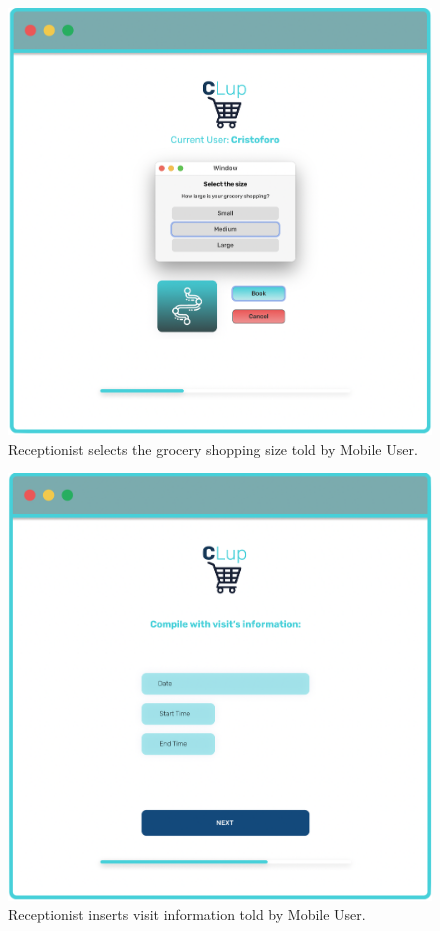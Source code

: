 \begin{figure}[H]
  \caption{Receptionist selects the grocery shopping size told by Mobile User.}
  \label{fig:Login}
  \centering
  \includegraphics[scale=0.31]{images/mockup/Size_Rec.png}

\end{figure}


\begin{figure}[H]
  \caption{Receptionist inserts visit information told by Mobile User.}
  \label{fig:Login}
  \centering
  \includegraphics[scale=0.31]{images/mockup/info_visit_rec.png}

\end{figure}

